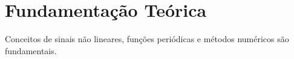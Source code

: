 \chapter{Fundamentação Teórica}
Conceitos de sinais não lineares, funções periódicas e métodos numéricos são fundamentais.

